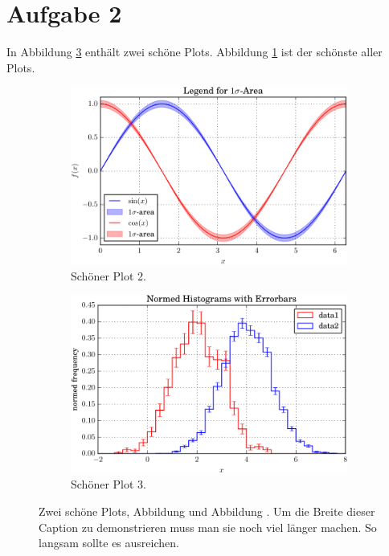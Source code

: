 \documentclass{scrartcl}
\begin{document}
\section*{Aufgabe 2}
In Abbildung \ref{fig:subfigs} enthält zwei schöne Plots.
Abbildung \ref{fig:plot2} ist der schönste aller Plots.
\begin{figure}
  \hspace*{\fill}
  \begin{subfigure}{0.40\textwidth}
    \centering
    \includegraphics[width=\textwidth]{plot2.pdf}
    \caption{Schöner Plot 2.}
    \label{fig:plot2}
  \end{subfigure}
  \hfill
  \begin{subfigure}{0.40\textwidth}
    \centering
    \includegraphics[width=\textwidth]{plot3.pdf}
    \caption{Schöner Plot 3.}
    \label{fig:plot3}
  \end{subfigure}
  \hspace*{\fill}
  \caption{
    Zwei schöne Plots, Abbildung  und Abbildung .
    Um die Breite dieser Caption zu demonstrieren muss man sie noch viel länger machen. 
    So langsam sollte es ausreichen.
  }
  \label{fig:subfigs}
\end{figure}
\end{document}
